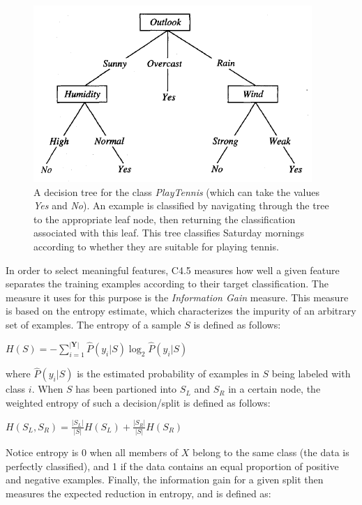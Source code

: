 \begin{center}
\begin{figure}[h]
\includegraphics[scale=0.70]{img/ex_decisiontree.png}
\caption{A decision tree for the class \textit{PlayTennis} (which can take the values \textit{Yes} and \textit{No}). An example is classified by navigating through the tree to the appropriate leaf node, then returning the classification associated with this leaf. This tree classifies Saturday mornings according to whether they are suitable for playing tennis.}
\label{fig:dttennis}
\end{figure}
\end{center}

In order to select meaningful features, C4.5 measures how well a given feature separates the training examples according to their target classification. The measure it uses for this purpose is the \textit{Information Gain} measure. This measure is based on the entropy estimate, which characterizes the impurity of an arbitrary set of examples. The entropy of a sample $S$ is defined as follows:

\begin{center}$H(S) = - \sum_{i=1}^{|\mathbf{Y}|} \widehat{P}(y_i|S) \log_2 \widehat{P} (y_i|S)$\end{center}

where $\widehat{P}(y_i|S)$ is the estimated probability of examples in $S$ being labeled with class $i$. When $S$ has been partioned into $S_L$ and $S_R$ in a certain node, the weighted entropy of such a decision/split is defined as follows:

\begin{center}$H(S_L,S_R) = \frac{|S_L|}{|S|}H(S_L) + \frac{|S_R|}{|S|}H(S_R)$\end{center}

Notice entropy is 0 when all members of $X$ belong to the same class (the data is perfectly classified), and 1 if the data contains an equal proportion of positive and negative examples. Finally, the information gain for a given split then measures the expected reduction in entropy, and is defined as:

